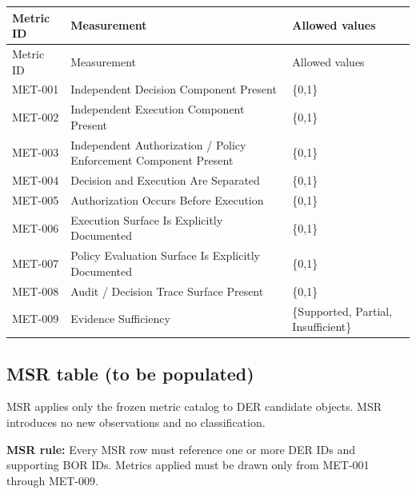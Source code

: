 \documentclass{article}
\begin{document}
\begin{longtable}{@{}p{}p{}p{}@{}}
\toprule
Metric ID & Measurement & Allowed values\\
\midrule
\endfirsthead
\toprule
Metric ID & Measurement & Allowed values\\
\midrule
\endhead
MET-001 & Independent Decision Component Present & \{0,1\}\\
MET-002 & Independent Execution Component Present & \{0,1\}\\
MET-003 & Independent Authorization / Policy Enforcement Component Present & \{0,1\}\\
MET-004 & Decision and Execution Are Separated & \{0,1\}\\
MET-005 & Authorization Occurs Before Execution & \{0,1\}\\
MET-006 & Execution Surface Is Explicitly Documented & \{0,1\}\\
MET-007 & Policy Evaluation Surface Is Explicitly Documented & \{0,1\}\\
MET-008 & Audit / Decision Trace Surface Present & \{0,1\}\\
MET-009 & Evidence Sufficiency & \{Supported, Partial, Insufficient\}\\
\bottomrule
\end{longtable}

\subsection*{MSR table (to be populated)}

MSR applies only the frozen metric catalog to DER candidate objects. MSR introduces no new observations and no classification.

\noindent\textbf{MSR rule:} Every MSR row must reference one or more DER IDs and supporting BOR IDs. Metrics applied must be drawn only from MET-001 through MET-009.
\end{document}
